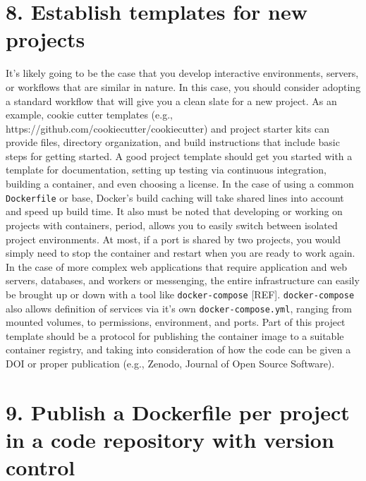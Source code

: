 \documentclass[10pt,letterpaper]{article}
\begin{document}
\hypertarget{establish-templates-for-new-projects}{%
\section{8. Establish templates for new
projects}\label{establish-templates-for-new-projects}}

It's likely going to be the case that you develop interactive
environments, servers, or workflows that are similar in nature. In this
case, you should consider adopting a standard workflow that will give
you a clean slate for a new project. As an example, cookie cutter
templates (e.g., https://github.com/cookiecutter/cookiecutter) and
project starter kits can provide files, directory organization, and
build instructions that include basic steps for getting started. A good
project template should get you started with a template for
documentation, setting up testing via continuous integration, building a
container, and even choosing a license. In the case of using a common
\texttt{Dockerfile} or base, Docker's build caching will take shared
lines into account and speed up build time. It also must be noted that
developing or working on projects with containers, period, allows you to
easily switch between isolated project environments. At most, if a port
is shared by two projects, you would simply need to stop the container
and restart when you are ready to work again. In the case of more
complex web applications that require application and web servers,
databases, and workers or messenging, the entire infrastructure can
easily be brought up or down with a tool like \texttt{docker-compose}
{[}REF{]}. \texttt{docker-compose} also allows definition of services
via it's own \texttt{docker-compose.yml}, ranging from mounted volumes,
to permissions, environment, and ports. Part of this project template
should be a protocol for publishing the container image to a suitable
container registry, and taking into consideration of how the code can be
given a DOI or proper publication (e.g., Zenodo, Journal of Open Source
Software).

\hypertarget{publish-a-dockerfile-per-project-in-a-code-repository-with-version-control}{%
\section*{9. Publish a Dockerfile per project in a code repository with
version
control}\label{publish-a-dockerfile-per-project-in-a-code-repository-with-version-control}}
\end{document}
